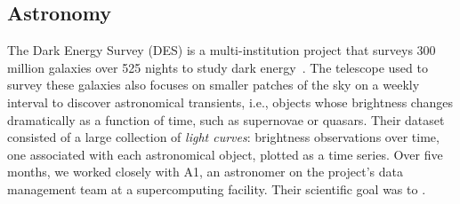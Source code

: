  \subsection{Astronomy}
 \par\noindent{} 
 \npar The Dark Energy Survey (DES) is a multi-institution project that surveys 300 million galaxies over 525 nights to study dark energy~\cite{DrlicaWagner2018}. The telescope used to survey these galaxies also focuses on smaller patches of the sky on a weekly interval to discover astronomical transients, i.e., objects whose brightness changes dramatically as a function of time, such as supernovae or quasars. Their dataset consisted of a large collection of \emph{light curves}: brightness observations over time, one associated with each astronomical object, plotted as a time series. Over five months, we worked closely with A1, an astronomer on the project's data management team at a supercomputing facility. Their scientific goal was to . 
